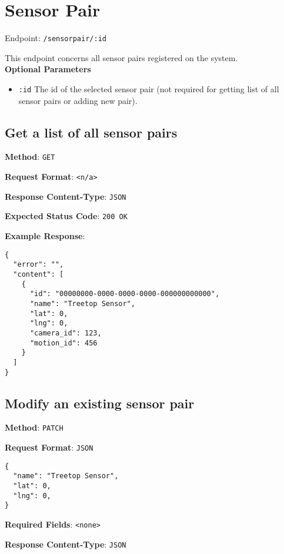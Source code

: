 \section{Sensor Pair}

Endpoint: \texttt{/sensorpair/:id}

\noindent
This endpoint concerns all sensor pairs registered on the system.\\

\noindent
\textbf{Optional Parameters}
\begin{itemize}
   \item \texttt{:id} \textemdash The id of the selected sensor pair (not required for getting list of all sensor pairs or adding new pair).
\end{itemize}


\subsection{Get a list of all sensor pairs}

\noindent
\textbf{Method}: \texttt{GET}

\noindent
\textbf{Request Format}: \texttt{<n/a>}

\noindent
\textbf{Response Content-Type}: \texttt{JSON}

\noindent
\textbf{Expected Status Code}: \texttt{200 OK}

\noindent
\textbf{Example Response}:
\begin{verbatim}
{ 
  "error": "",
  "content": [
    {
      "id": "00000000-0000-0000-0000-000000000000",
      "name": "Treetop Sensor",
      "lat": 0,
      "lng": 0,
      "camera_id": 123,
      "motion_id": 456
    }
  ]
}
\end{verbatim}


\subsection{Modify an existing sensor pair}

\noindent
\textbf{Method}: \texttt{PATCH}

\noindent
\textbf{Request Format}: \texttt{JSON}
\begin{verbatim}
{ 
  "name": "Treetop Sensor",
  "lat": 0,
  "lng": 0,
}
\end{verbatim}

\noindent
\textbf{Required Fields}: \texttt{<none>}

\noindent
\textbf{Response Content-Type}: \texttt{JSON}

